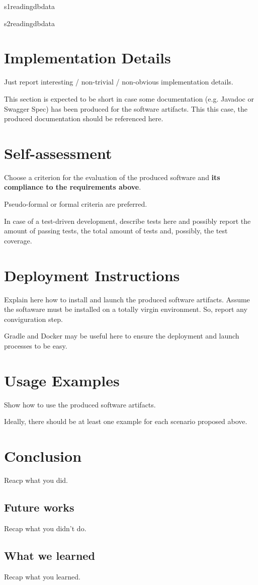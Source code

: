 \documentclass[12pt,a4paper,oneside,article]{article}
\begin{document}
			\begin{sequencediagram}
				\begin{call}{s1}{reading}{db}{data}
					\postlevel
				\end{call}
				\prelevel\prelevel
				\begin{call}{s2}{reading}{db}{data}
					\postlevel
				\end{call}
			\end{sequencediagram}
			
	\section{Implementation Details}
		Just report interesting / non-trivial / non-obvious implementation details.
		
		This section is expected to be short in case some documentation (e.g. Javadoc or Swagger Spec) has been produced for the software artifacts. This this case, the produced documentation should be referenced here.
		
	\section{Self-assessment}
		Choose a criterion for the evaluation of the produced software and \textbf{its compliance to the requirements above}.
		
		Pseudo-formal or formal criteria are preferred.
		
		In case of a test-driven development, describe tests here and possibly report the amount of passing tests, the total amount of tests and, possibly, the test coverage.
		
	\section{Deployment Instructions}
		Explain here how to install and launch the produced software artifacts. Assume the softaware must be installed on a totally virgin environment. So, report any conviguration step.
		
		Gradle and Docker may be useful here to ensure the deployment and launch processes to be easy.
		
	\section{Usage Examples}
		Show how to use the produced software artifacts.
		
		Ideally, there should be at least one example for each scenario proposed above.
		
	\section{Conclusion}
		Reacp what you did.
		
		\subsection{Future works}
			Recap what you didn't do.
		
		\subsection{What we learned}
			Recap what you learned.
\end{document}

